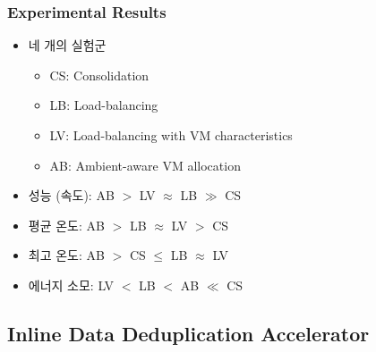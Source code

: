 \subsubsection*{Experimental Results}
\begin{itemize}
    \item 네 개의 실험군
    \begin{itemize}
        \item CS: Consolidation
        \item LB: Load-balancing
        \item LV: Load-balancing with VM characteristics
        \item AB: Ambient-aware VM allocation
    \end{itemize}
    \item 성능 (속도): AB $>$ LV $\approx$ LB $\gg$ CS
    \item 평균 온도: AB $>$ LB $\approx$ LV $>$ CS
    \item 최고 온도: AB $>$ CS $\leq$ LB $\approx$ LV
    \item 에너지 소모: LV $<$ LB $<$ AB $\ll$ CS
\end{itemize}

\subsection{Inline Data Deduplication Accelerator}

